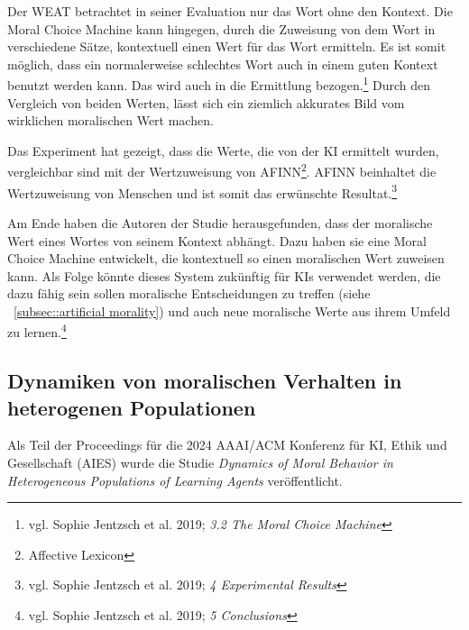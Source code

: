 Der WEAT betrachtet in seiner Evaluation nur das Wort ohne den Kontext.
Die Moral Choice Machine kann hingegen, durch die Zuweisung von dem Wort in verschiedene Sätze, kontextuell einen Wert für das
Wort ermitteln.
Es ist somit möglich, dass ein normalerweise schlechtes Wort auch in einem guten Kontext benutzt werden kann.
Das wird auch in die Ermittlung bezogen.\footnote{vgl. Sophie Jentzsch et al. 2019; \textit{3.2 The Moral Choice Machine}}
Durch den Vergleich von beiden Werten, lässt sich ein ziemlich akkurates Bild vom wirklichen moralischen Wert machen.

Das Experiment hat gezeigt, dass die Werte, die von der KI ermittelt wurden, vergleichbar sind mit der Wertzuweisung von AFINN\footnote{Affective Lexicon}.
AFINN beinhaltet die Wertzuweisung von Menschen und ist somit das erwünschte Resultat.\footnote{vgl. Sophie Jentzsch et al. 2019; \textit{4 Experimental Results}}

Am Ende haben die Autoren der Studie herausgefunden, dass der moralische Wert eines Wortes von seinem Kontext abhängt.
Dazu haben sie eine Moral Choice Machine entwickelt, die kontextuell so einen moralischen Wert zuweisen kann.
Als Folge könnte dieses System zukünftig für KIs verwendet werden, die dazu fähig sein sollen moralische Entscheidungen zu treffen (siehe ~\ref{subsec::artificial morality})
und auch neue moralische Werte aus ihrem Umfeld zu lernen.\footnote{vgl. Sophie Jentzsch et al. 2019; \textit{5 Conclusions}}

\subsection{Dynamiken von moralischen Verhalten in heterogenen Populationen}\label{subsec::dynamiken moralischen verhalten}

Als Teil der Proceedings für die 2024 AAAI/ACM Konferenz für KI, Ethik und Gesellschaft (AIES) wurde die Studie
\textit{Dynamics of Moral Behavior in Heterogeneous Populations of Learning Agents} veröffentlicht.

